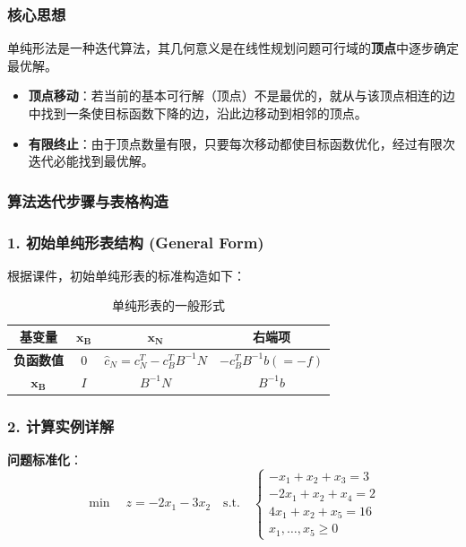 \documentclass[a4paper,12pt]{ctexart} %
\begin{document}
	\subsubsection{核心思想}
	单纯形法是一种迭代算法，其几何意义是在线性规划问题可行域的\textbf{顶点}中逐步确定最优解。
	\begin{itemize}
		\item \textbf{顶点移动}：若当前的基本可行解（顶点）不是最优的，就从与该顶点相连的边中找到一条使目标函数下降的边，沿此边移动到相邻的顶点。
		\item \textbf{有限终止}：由于顶点数量有限，只要每次移动都使目标函数优化，经过有限次迭代必能找到最优解。
	\end{itemize}
	
	\subsubsection{算法迭代步骤与表格构造}
	
	
	\subsubsection*{1. 初始单纯形表结构 (General Form)}
	根据课件，初始单纯形表的标准构造如下：
	
	\begin{table}[H]
		\centering
		\renewcommand{\arraystretch}{1.5} %
		\begin{tabular}{cccc}
			\toprule
			\textbf{基变量} & $\bm{x_B}$ & $\bm{x_N}$ & \textbf{右端项} \\
			\hline
			\textbf{负函数值} & $0$ & $\hat{c}_N = c_N^T - c_B^T B^{-1} N$ & $-c_B^T B^{-1} b (= -f)$ \\
			\hline
			$\bm{x_B}$ & $I$ & $B^{-1}N$ & $B^{-1}b$ \\
			\bottomrule
		\end{tabular}
		\caption{单纯形表的一般形式}
	\end{table}
	
	\subsubsection*{2. 计算实例详解}
	\textbf{问题标准化}：
	\begin{equation}
		\min \quad z = -2x_1 - 3x_2 \quad \text{s.t.} \quad 
		\begin{cases} 
			-x_1 + x_2 + x_3 = 3 \\ 
			-2x_1 + x_2 + x_4 = 2 \\ 
			4x_1 + x_2 + x_5 = 16 \\ 
			x_1, \dots, x_5 \ge 0 
		\end{cases}
	\end{equation}
	
\end{document}
